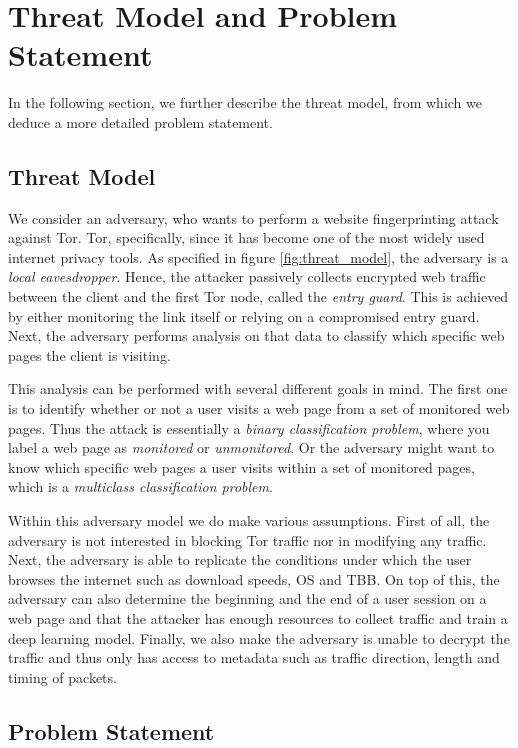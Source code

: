 \chapter{Threat Model and Problem Statement}

In the following section, we further describe the threat model, from which we deduce a more detailed problem statement.

\section{Threat Model} \label{sec:threat-model}

We consider an adversary, who wants to perform a website fingerprinting attack against Tor.
Tor, specifically, since it has become one of the most widely used internet privacy tools.
As specified in figure \ref{fig:threat_model}, the adversary is a \textit{local eavesdropper}.
Hence, the attacker passively collects encrypted web traffic between the client and the first Tor node, called the \textit{entry guard}.
This is achieved by either monitoring the link itself or relying on a compromised entry guard.
Next, the adversary performs analysis on that data to classify which specific web pages the client is visiting.

This analysis can be performed with several different goals in mind.
The first one is to identify whether or not a user visits a web page from a set of monitored web pages.
Thus the attack is essentially a \textit{binary classification problem}, where you label a web page as \textit{monitored} or \textit{unmonitored}.
Or the adversary might want to know which specific web pages a user visits within a set of monitored pages, which is a \textit{multiclass classification problem}.

Within this adversary model we do make various assumptions.
First of all, the adversary is not interested in blocking Tor traffic nor in modifying any traffic.
Next, the adversary is able to replicate the conditions under which the user browses the internet such as download speeds, OS and TBB.
On top of this, the adversary can also determine the beginning and the end of a user session on a web page and that the attacker has enough resources to collect traffic and train a deep learning model.
Finally, we also make the adversary is unable to decrypt the traffic and thus only has access to metadata such as traffic direction, length and timing of packets.

\section{Problem Statement}

